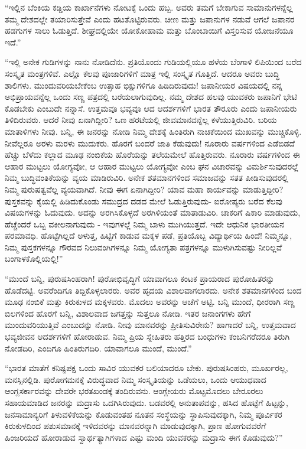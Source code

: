  “ಇಲ್ಲಿನ ಬೆಂಕಿಯ ಕಡ್ಡಿಯ ಕಾರ್ಖಾನೆಗಳು ನೋಟಕ್ಕೆ ಒಂದು ಹಬ್ಬ. ಅವರು ತಮಗೆ ಬೇಕಾಗುವ ಸಾಮಾನುಗಳನ್ನೆಲ್ಲ ತಮ್ಮ ದೇಶದಲ್ಲೇ ತಯಾರಿಸುತ್ತೇವೆ ಎಂದು ಹಟತೊಟ್ಟಿರುವರು. ಚೀಣ ಮತ್ತು ಜಪಾನುಗಳ ನಡುವೆ ಆಗಲೆ ಜಪಾನರ ಹಡಗುಗಳ ಸಾಲು ಓಡುತ್ತಿದೆ. ಶೀಘ್ರದಲ್ಲಿಯೇ ಯೋಕೋಹಾಮ ಮತ್ತು ಬೊಂಬಾಯಿಗೆ ವಿಸ್ತರಿಸುವ ಯೋಜನೆಯೂ ಇದೆ.” 

 “ಇಲ್ಲಿ ಅನೇಕ ಗುಡಿಗಳನ್ನು ನಾನು ನೋಡಿದೆನು. ಪ್ರತಿಯೊಂದು ಗುಡಿಯಲ್ಲಿಯೂ ಹಳೆಯ ಬೆಂಗಾಳಿ ಲಿಪಿಯಿಂದ ಬರೆದ ಸಂಸ್ಕೃತ ಮಂತ್ರಗಳಿವೆ. ಎಲ್ಲೊ ಕೆಲವು ಪೂಜಾರಿಗಳಿಗೆ ಮಾತ್ರ ಇಲ್ಲಿ ಸಂಸ್ಕೃತ ಗೊತ್ತಿದೆ. ಆದರೂ ಅವರು ಬುದ್ಧಿ ಶಾಲಿಗಳು. ಮುಂದುವರಿಯಬೇಕೆಂಬ ಉತ್ಸಾಹ ಭಿಕ್ಷುಗಳಿಗೂ ಹಿಡಿದಿರುವುದು! ಜಪಾನೀಯರ ವಿಷಯದಲ್ಲಿ ನನ್ನ ಅಭಿಪ್ರಾಯವನ್ನೆಲ್ಲ ಒಂದು ಸಣ್ಣ ಪತ್ರದಲ್ಲಿ ಬರೆಯಲಾಗುವುದಿಲ್ಲ. ನಮ್ಮ ದೇಶದ ಹಲವು ಯುವಕರು ಜಪಾನಿಗೆ ಭೇಟಿ ಕೊಡಬೇಕು ಎಂಬುದೇ ನನ್ನಾಸೆ. ಉತ್ತಮವೂ ಭವ್ಯವೂ ಆದ ಆದರ್ಶಗಳಿಗೆ ಭಾರತ ತೌರೂರು ಎಂದು ಜಪಾನೀಯರು ತಿಳಿದಿರುವರು. ಆದರೆ ನೀವು ಏನಾಗಿದ್ದೀರಿ? ಒಣ ಹರಟೆಯಲ್ಲಿ ಜೀವಮಾನವನ್ನೆಲ್ಲ ಕಳೆಯುತ್ತಿರುವಿರಿ. ಬರಿಯ ಮಾತಾಳಿಗಳು ನೀವು. ಬನ್ನಿ, ಈ ಜನರನ್ನು ನೋಡಿ ನಿಮ್ಮ ದೇಶಕ್ಕೆ ಹಿಂತಿರುಗಿ ನಾಚಿಕೆಯಿಂದ ಮುಖವನ್ನು ಮುಚ್ಚಿಕೊಳ್ಳಿ. ನೀವೆಲ್ಲರೂ ಅರಳು ಮರಳು ಮುದುಕರು. ಹೊರಗೆ ಬಂದರೆ ಜಾತಿ ಕೆಡುವುದು! ನೂರಾರು ವರ್ಷಗಳಿಂದ ಎಡೆಬಿಡದೆ ಹೆಚ್ಚು ಬೆಳೆದು ಕಲ್ಲಾದ ಮೂಢ ನಂಬಿಕೆಯ ಹೊರೆಯನ್ನು ತಲೆಯಮೇಲೆ ಹೊತ್ತಿರುವರು. ನೂರಾರು ವರ್ಷಗಳಿಂದ ಈ ಆಹಾರ ಮುಟ್ಟಲು ಯೋಗ್ಯವೋ, ಆ ಆಹಾರ ಮುಟ್ಟಲು ಯೋಗ್ಯವೋ ಎಂಬ ಘನ ವಿಚಾರವನ್ನು ವಿಮರ್ಶಿಸುವುದರಲ್ಲೆ ನಿಮ್ಮ ಬುದ್ಧಿವಂತಿಕೆಯನ್ನು ವ್ಯಯ ಮಾಡಿರುವಿರಿ. ಅನೇಕ ಶತಮಾನಗಳಿಂದ ಸಮಾಜವನ್ನು ಸತತ ಪೀಡಿಸುವುದರಲ್ಲಿ ನಿಮ್ಮ ಪುರುಷತ್ವವೆಲ್ಲ ವ್ಯಯವಾಗಿದೆ. ನೀವು ಈಗ ಏನಾಗಿದ್ದೀರಿ? ಯಾವ ಮಹಾ ಕಾರ್ಯವನ್ನು ಮಾಡುತ್ತಿದ್ದೀರಿ? ಪುಸ್ತಕವನ್ನು ಕೈಯಲ್ಲಿ ಹಿಡಿದುಕೊಂಡು ಸಮುದ್ರದ ದಡದ ಮೇಲೆ ಓಡುತ್ತಿರುವುದು- ಐರೋಪ್ಯರು ಬರೆದ ಕೆಲವು ವಿಷಯಗಳನ್ನು ಓದುವುದು. ಅದನ್ನು ಅರಗಿಸಿಕೊಳ್ಳದೆ ಅರಗಿಳಿಯಂತೆ ಮಾತಾಡುವಿರಿ. ಚಾಕರಿಗೆ ಷಿಕಾರಿ ಮಾಡುವುದು, ಹೆಚ್ಚೆಂದರೆ ಒಬ್ಬ ವಕೀಲನಾಗುವುದು - ಇವುಗಳಲ್ಲೆ ನಿಮ್ಮ ಬಾಳು ಮುಗಿಯುತ್ತದೆ. ಇದೇ ಆಧುನಿಕ ಭಾರತೀಯನ ಪರಮಾವಧಿ. ಹೊಟ್ಟೆಗಿಲ್ಲದೆ ಅಳುತ್ತ, ಹಿಟ್ಟಿಗೆ ಕಾಡುವ ಮಕ್ಕಳ ಪಡೆ, ಪ್ರತಿಯೊಬ್ಬ ವಿದ್ಯಾರ್ಥಿಯ ಹಿಂದೆ! ನಿಮ್ಮನ್ನೂ, ನಿಮ್ಮ ಪುಸ್ತಕಗಳನ್ನೂ ಗೌರವದ ನಿಲುವಂಗಿಗಳನ್ನೂ ನಿಮ್ಮ ಯೋಗ್ಯತಾ ಪತ್ರಗಳನ್ನೂ ಮುಳುಗಿಸುವಷ್ಟು ನೀರಿಲ್ಲವೆ ಬಂಗಾಳಕೊಲ್ಲಿಯಲ್ಲಿ!” 

 “ಮುಂದೆ ಬನ್ನಿ, ಪುರುಷಸಿಂಹರಾಗಿ! ಪುರೋಭಿವೃದ್ಧಿಗೆ ಯಾವಾಗಲೂ ಕಂಟಕ ಪ್ರಾಯರಾದ ಪುರೋಹಿತರನ್ನು ಹೊಡೆದಟ್ಟಿ. ಅವರೆಂದಿಗೂ ತಿದ್ದಿಕೊಳ್ಳಲಾರರು. ಅವರ ಹೃದಯ ವಿಶಾಲವಾಗಲಾರದು. ಅನೇಕ ಶತಮಾನಗಳಿಂದ ಬಂದ ಮೂಢ ನಂಬಿಕೆ ಮತ್ತು ಕಿರುಕುಳದ ಮಕ್ಕಳವರು. ಮೊದಲು ಅವರನ್ನು ಆಚೆಗೆ ಅಟ್ಟಿ. ಬನ್ನಿ ಮುಂದೆ, ಧೀರರಾಗಿ ಸಣ್ಣ ಬಿಲಗಳಿಂದ ಹೊರಗೆ ಬನ್ನಿ, ವಿಶಾಲವಾದ ಜಗತ್ತನ್ನು ಸುತ್ತಲೂ ನೋಡಿ. ಇತರ ಜನಾಂಗಗಳು ಹೇಗೆ ಮುಂದುವರಿಯುತ್ತಿವೆ ಎಂಬುದನ್ನು ನೋಡಿ. ನೀವು ಮಾನವರನ್ನು ಪ್ರೀತಿಸುವಿರೇನು? ಹಾಗಾದರೆ ಬನ್ನಿ, ಉತ್ತಮವಾದ ಭವ್ಯಜೀವನ ಆದರ್ಶಗಳಿಗೆ ಹೋರಾಡುವ. ನಿಮ್ಮ ಪ್ರಿಯ ಸ್ನೇಹಿತರು ಹತ್ತಿರದ ಬಂಧುಗಳು ಕಂಬನಿಗರೆದರೂ ತಿರುಗಿ ನೋಡದಿರಿ, ಎಂದಿಗೂ ಹಿಂತಿರುಗದಿರಿ. ಯಾವಾಗಲೂ ಮುಂದೆ, ಮುಂದೆ.” 

 “ಭಾರತ ಮಾತೆಗೆ ಕನಿಷ್ಟಪಕ್ಷ ಒಂದು ಸಾವಿರ ಯುವಕರ ಬಲಿಯಾದರೂ ಬೇಕು. ಪುರುಷಸಿಂಹರು, ಮೂರ್ಖರಲ್ಲ, ಮನಸ್ಸಿನಲ್ಲಿಡಿ. ಪುರೋಗಮನಕ್ಕೆ ವಿರುದ್ಧವಾದ ನಿಮ್ಮ ಸಂಸ್ಕೃತಿಯನ್ನು ಒಡೆಯಲು, ಒಂದು ಆಯುಧವಾದ ಆಂಗ್ಲಸರ್ಕಾರವನ್ನು ದೇವರೇ ಭರತಖಂಡಕ್ಕೆ ತಂದಿರುವನು. ಆಂಗ್ಲೇಯರು ಮೊಟ್ಟಮೊದಲು ಬೇರೂರಲು ಸಹಾಯಮಾಡಿದ ಜನರನ್ನು ಮದ್ರಾಸು ಒದಗಿಸಿರುವುದು. ಬಡವರಲ್ಲಿ ಅನುತಾಪವನ್ನು, ಹಸಿದ ಹೊಟ್ಟೆಗೆ ಹಿಟ್ಟನ್ನು, ಜನಸಾಮಾನ್ಯರಿಗೆ ತಿಳುವಳಿಕೆಯನ್ನು ಕೊಡುವಂತಹ ನೂತನ ಸಂಸ್ಥೆಯನ್ನು ಸ್ಥಾಪಿಸುವುದಕ್ಕಾಗಿ, ನಿಮ್ಮ ಪೂರ್ವಿಕರ ಕಿರುಕುಳದಿಂದ ಪಶುಸಮಾನಕ್ಕೆ ಇಳಿದವರನ್ನು ಮಾನವರನ್ನಾಗಿ ಮಾಡುವುದಕ್ಕಾಗಿ, ಪ್ರಾಣ ಹೋಗುವವರೆಗೆ ಹಿಂಜರಿಯದೆ ಹೋರಾಡುವ ಸ್ವಾರ್ಥತ್ಯಾಗಿಗಳಾದ ಎಷ್ಟು ಮಂದಿ ಯುವಕರನ್ನು ಮದ್ರಾಸು ಈಗ ಕೊಡುವುದು?” 

